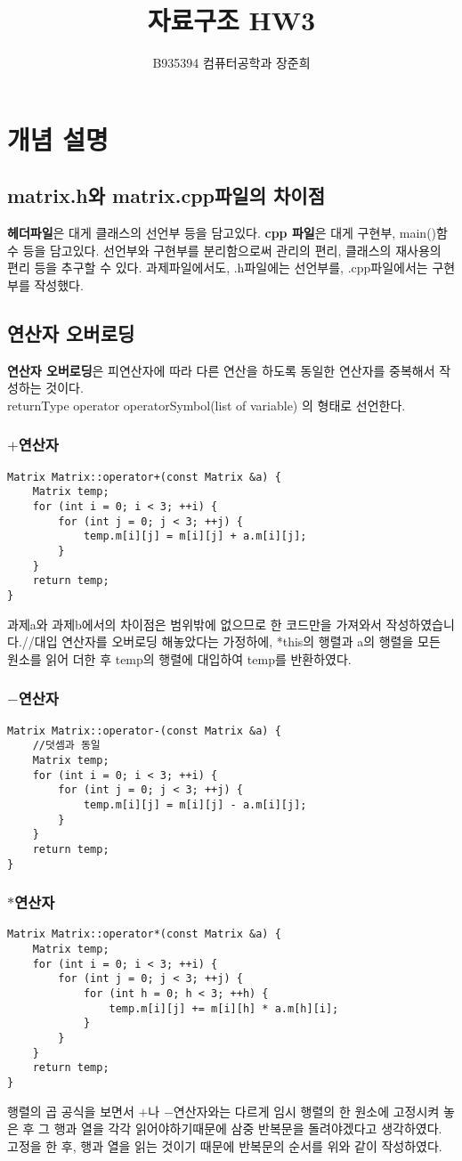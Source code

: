 \documentclass[a4paper,11pt]{article}
\begin{document}
\title{자료구조 HW3}
\author{B935394 컴퓨터공학과 장준희}
\maketitle
\newpage
\section{개념 설명}
\subsection{matrix.h와 matrix.cpp파일의 차이점}
\textbf{헤더파일}은 대게 클래스의 선언부 등을 담고있다. \textbf{cpp 파일}은 대게 구현부, main()함수 등을 담고있다. 선언부와 구현부를 분리함으로써 관리의 편리, 클래스의 재사용의 편리 등을 추구할 수 있다. 과제파일에서도, .h파일에는 선언부를, .cpp파일에서는 구현부를 작성했다.
\subsection{연산자 오버로딩}
\textbf{연산자 오버로딩}은 피연산자에 따라 다른 연산을 하도록 동일한 연산자를 중복해서 작성하는 것이다.\\ returnType operator operatorSymbol(list of variable) 의 형태로 선언한다.
\subsubsection{$+$연산자}
\begin{Verbatim}
Matrix Matrix::operator+(const Matrix &a) {
	Matrix temp;
	for (int i = 0; i < 3; ++i) {
		for (int j = 0; j < 3; ++j) {
			temp.m[i][j] = m[i][j] + a.m[i][j];
		}
	}
	return temp;
}
\end{Verbatim}
과제a와 과제b에서의 차이점은 범위밖에 없으므로 한 코드만을 가져와서 작성하였습니다.//대입 연산자를 오버로딩 해놓았다는 가정하에, *this의 행렬과 a의 행렬을 모든 원소를 읽어 더한 후 temp의 행렬에 대입하여 temp를 반환하였다.
\subsubsection{$-$연산자}
\begin{Verbatim}
Matrix Matrix::operator-(const Matrix &a) {
	//덧셈과 동일
	Matrix temp;
	for (int i = 0; i < 3; ++i) {
		for (int j = 0; j < 3; ++j) {
			temp.m[i][j] = m[i][j] - a.m[i][j];
		}
	}
	return temp;
}
\end{Verbatim}
\subsubsection{$*$연산자}
\begin{Verbatim}
Matrix Matrix::operator*(const Matrix &a) {
	Matrix temp;
	for (int i = 0; i < 3; ++i) {
		for (int j = 0; j < 3; ++j) {
			for (int h = 0; h < 3; ++h) {
				temp.m[i][j] += m[i][h] * a.m[h][i];
			}
		}
	}
	return temp;
}
\end{Verbatim}
행렬의 곱 공식을 보면서 $+$나 $-$연산자와는 다르게 임시 행렬의 한 원소에 고정시켜 놓은 후 그 행과 열을 각각 읽어야하기때문에 삼중 반복문을 돌려야겠다고 생각하였다. 고정을 한 후, 행과 열을 읽는 것이기 때문에 반복문의 순서를 위와 같이 작성하였다.
\end{document}
